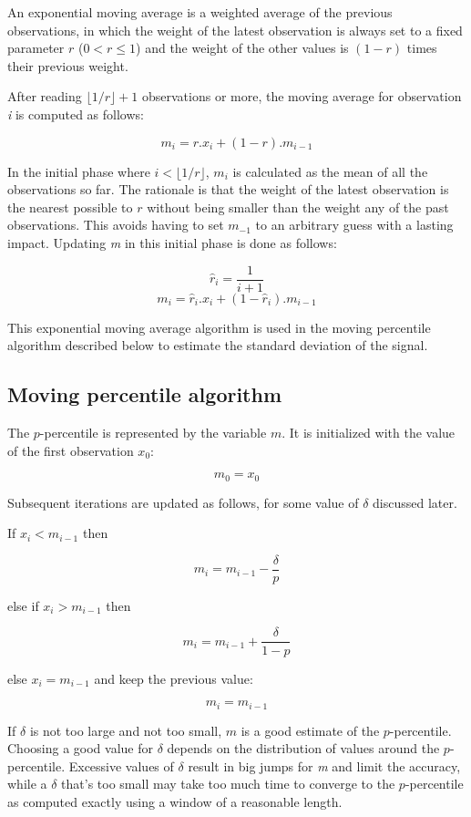 \documentclass[]{article}
\begin{document}
An exponential moving average is a weighted average of the previous
observations, in which the weight of the latest observation is always
set to a fixed parameter \(r\) (\(0 < r \le 1\)) and the weight of the
other values is \((1-r)\) times their previous weight.

After reading \(\lfloor 1/r \rfloor + 1\) observations or more, the
moving average for observation \emph{i} is computed as follows:

\[m_i = r . x_i + (1-r) . m_{i-1}\]

In the initial phase where \(i < \lfloor 1/r \rfloor\), \(m_i\) is
calculated as the mean of all the observations so far. The rationale is
that the weight of the latest observation is the nearest possible to
\(r\) without being smaller than the weight any of the past
observations. This avoids having to set \(m_{-1}\) to an arbitrary guess
with a lasting impact. Updating \emph{m} in this initial phase is done
as follows:

\[\hat{r}_i = \frac{1}{i+1}\]
\[m_i = \hat{r}_i . x_i + (1-\hat{r}_i) . m_{i-1}\]

This exponential moving average algorithm is used in the moving
percentile algorithm described below to estimate the standard deviation
of the signal.

\subsection{Moving percentile
algorithm}\label{moving-percentile-algorithm}

The \(p\)-percentile is represented by the variable \(m\). It is
initialized with the value of the first observation \(x_0\):

\[ m_0 = x_0 \]

Subsequent iterations are updated as follows, for some value of
\(\delta\) discussed later.

If \(x_i < m_{i-1}\) then

\[ m_i = m_{i-1} - \frac{\delta}{p} \]

else if \(x_i > m_{i-1}\) then

\[ m_i = m_{i-1} + \frac{\delta}{1-p} \]

else \(x_i = m_{i-1}\) and keep the previous value:

\[ m_i = m_{i-1} \]

If \(\delta\) is not too large and not too small, \(m\) is a good
estimate of the \(p\)-percentile. Choosing a good value for \(\delta\)
depends on the distribution of values around the \(p\)-percentile.
Excessive values of \(\delta\) result in big jumps for \emph{m} and
limit the accuracy, while a \(\delta\) that's too small may take too
much time to converge to the \(p\)-percentile as computed exactly using
a window of a reasonable length.
\end{document}
